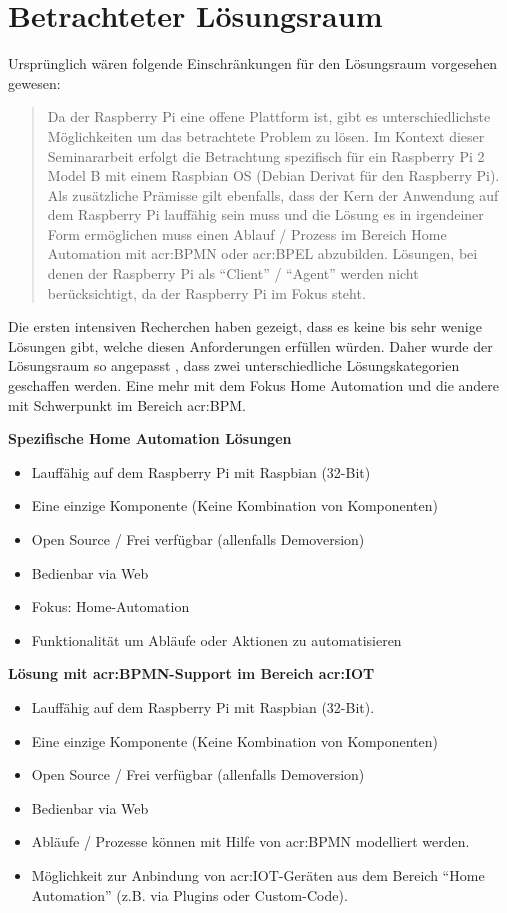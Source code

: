 \section{Betrachteter Lösungsraum}
Ursprünglich wären folgende Einschränkungen für den Lösungsraum vorgesehen gewesen:
\blockquote {Da der Raspberry Pi eine offene Plattform ist, gibt es unterschiedlichste Möglichkeiten um das betrachtete Problem zu lösen. Im Kontext dieser Seminararbeit erfolgt die Betrachtung spezifisch für ein Raspberry Pi 2 Model B mit einem Raspbian OS (Debian Derivat für den Raspberry Pi). Als zusätzliche Prämisse gilt ebenfalls, dass der Kern der Anwendung auf dem Raspberry Pi lauffähig sein muss und die Lösung es in irgendeiner Form ermöglichen muss einen Ablauf / Prozess im Bereich Home Automation mit \gls{acr:BPMN} oder \gls{acr:BPEL} abzubilden. Lösungen, bei denen der Raspberry Pi als "`Client"' / "`Agent"' werden nicht berücksichtigt, da der Raspberry Pi im Fokus steht.}

Die ersten intensiven Recherchen haben gezeigt, dass es keine bis sehr wenige Lösungen gibt, welche diesen Anforderungen erfüllen würden. Daher wurde der Lösungsraum so angepasst , dass zwei unterschiedliche Lösungskategorien geschaffen werden. Eine mehr mit dem Fokus Home Automation und die andere mit Schwerpunkt im Bereich \gls{acr:BPM}.

\textbf{Spezifische Home Automation Lösungen}
\begin{itemize}
\item Lauffähig auf dem Raspberry Pi mit Raspbian (32-Bit)
\item Eine einzige Komponente (Keine Kombination von Komponenten)
\item Open Source / Frei verfügbar (allenfalls Demoversion)
\item Bedienbar via Web
\item Fokus: Home-Automation
\item Funktionalität um Abläufe oder Aktionen zu automatisieren
\end{itemize}

\textbf{Lösung mit \gls{acr:BPMN}-Support im Bereich \gls{acr:IOT}}
\begin{itemize}
\item Lauffähig auf dem Raspberry Pi mit Raspbian (32-Bit).
\item Eine einzige Komponente (Keine Kombination von Komponenten)
\item Open Source / Frei verfügbar (allenfalls Demoversion)
\item Bedienbar via Web
\item Abläufe / Prozesse können mit Hilfe von \gls{acr:BPMN} modelliert werden.
\item Möglichkeit zur Anbindung von \gls{acr:IOT}-Geräten aus dem Bereich "`Home Automation"' (z.B. via Plugins oder Custom-Code).
\end{itemize}


